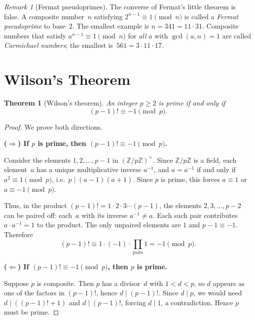 \documentclass[12pt,a4paper,openany]{book}
\theoremstyle{definition}
\theoremstyle{plain}
\newtheorem{theorem}[definition]{Theorem}
\theoremstyle{remark}
\newtheorem{remark}[definition]{Remark}
\newcommand{\Z}{\mathbb{Z}}
\begin{document}
\begin{remark}[Fermat pseudoprimes]
\label{rem:pseudoprimes}
The converse of Fermat's little theorem is false.  A composite number~$n$
satisfying $2^{n-1} \equiv 1 \pmod{n}$ is called a
\emph{Fermat pseudoprime} to base~$2$.
The smallest example is $n = 341 = 11 \cdot 31$.  Composite numbers that
satisfy $a^{n-1} \equiv 1 \pmod{n}$ for \emph{all} $a$ with $\gcd(a,n)=1$
are called \emph{Carmichael numbers}; the smallest
is~$561 = 3 \cdot 11 \cdot 17$.
\end{remark}

\section{Wilson's Theorem}
\label{sec:wilson}

\begin{theorem}[Wilson's theorem]
\label{thm:wilson}
An integer $p \ge 2$ is prime if and only if
\[
  (p-1)! \equiv -1 \pmod{p}.
\]
\end{theorem}

\begin{proof}
We prove both directions.

\medskip\noindent
\textbf{($\Rightarrow$) If $p$ is prime, then $(p-1)! \equiv -1 \pmod{p}$.}

Consider the elements $1, 2, \dots, p-1$ in $(\Z/p\Z)^\times$.  Since
$\Z/p\Z$ is a field, each element~$a$ has a unique multiplicative inverse
$a^{-1}$, and $a = a^{-1}$ if and only if $a^2 \equiv 1 \pmod{p}$, i.e.\
$p \mid (a-1)(a+1)$.  Since $p$ is prime, this forces $a \equiv 1$ or
$a \equiv -1 \pmod{p}$.

Thus, in the product $(p-1)! = 1 \cdot 2 \cdot 3 \cdots (p-1)$, the elements
$2, 3, \dots, p-2$ can be paired off: each~$a$ with its inverse $a^{-1} \neq a$.
Each such pair contributes $a \cdot a^{-1} = 1$ to the product.  The only
unpaired elements are $1$ and $p-1 \equiv -1$.  Therefore
\[
  (p-1)! \equiv 1 \cdot (-1) \cdot \prod_{\text{pairs}} 1 = -1 \pmod{p}.
\]

\medskip\noindent
\textbf{($\Leftarrow$) If $(p-1)! \equiv -1 \pmod{p}$, then $p$ is prime.}

Suppose $p$ is composite.  Then $p$ has a divisor~$d$ with $1 < d < p$,
so $d$ appears as one of the factors in $(p-1)!$, hence $d \mid (p-1)!$.
Since $d \mid p$, we would need $d \mid ((p-1)! + 1)$ and $d \mid (p-1)!$,
forcing $d \mid 1$, a contradiction.  Hence $p$ must be prime.
\end{proof}
\end{document}
